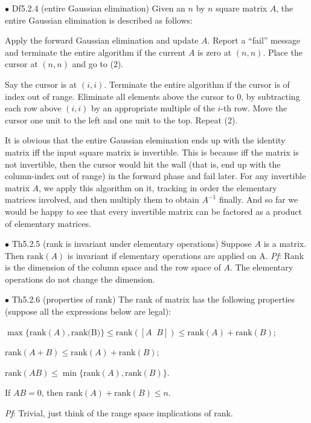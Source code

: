 \documentclass{article}
\begin{document}
\begin{Df}{$\bullet$ Df5.2.4 (entire Gaussian elimination)}
    Given an $n$ by $n$ square matrix $A$, the entire Gaussian elimination is described as follows:
    \begin{compactenum}
        \item Apply the forward Gaussian elimination and update $A$. Report a ``fail'' message and terminate the entire algorithm if the current $A$ is zero at $(n,n)$. Place the cursor at $(n,n)$ and go to (2).
        \item Say the cursor is at $(i,i)$. Terminate the entire algorithm if the cursor is of index out of range. Eliminate all elements above the cursor to $0$, by subtracting each row above $(i,i)$ by an appropriate multiple of the $i$-th row. Move the cursor one unit to the left and one unit to the top. Repeat (2).
    \end{compactenum}
\end{Df}

\begin{Rmk}{}
    It is obvious that \textcolor{Th}{the entire Gaussian elemination ends up with the identity matrix iff the input square matrix is invertible.} This is because iff the matrix is not invertible, then the cursor would hit the wall (that is, end up with the column-index out of range) in the forward phase and fail later. For any invertible matrix $A$, we apply this algorithm on it, tracking in order the elementary matrices involved, and then multiply them to obtain $A^{-1}$ finally. And so far we would be happy to see that \textcolor{Th}{every invertible matrix can be factored as a product of elementary matrices.}
\end{Rmk}

\begin{Th}{$\bullet$ Th5.2.5 (rank is invariant under elementary operations)}
    Suppose $A$ is a matrix. Then $\text{rank}(A)$ is invariant if elementary operations are applied on A.
    \tcblower
    \textit{Pf}: Rank is the dimension of the column space and the row space of $A$. The elementary operations do not change the dimension.
\end{Th}

\begin{Th}{$\bullet$ Th5.2.6 (properties of rank)}
    The rank of matrix has the following properties (suppose all the expressions below are legal):
    \begin{compactenum}
        \item $\max \{\text{rank}(A), \text{rank(B)}\} \leq \text{rank}([A\;\; B]) \leq \text{rank}(A)+ \text{rank}(B)$;
        \item $\text{rank}(A+B)\leq \text{rank}(A)+\text{rank}(B)$;
        \item $\text{rank}(AB)\leq \min\{\text{rank}(A), \text{rank}(B)\}$.
        \item If $AB=0$, then $\text{rank}(A)+\text{rank}(B)\leq n$.
    \end{compactenum}
    \tcblower
    \textit{Pf}: Trivial, just think of the range space implications of rank.
\end{Th}
\end{document}
